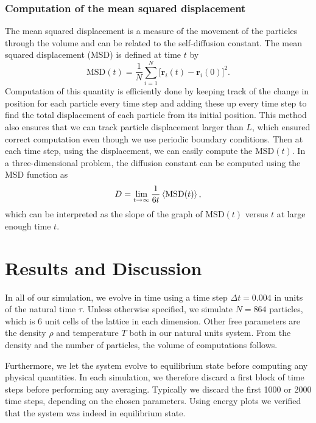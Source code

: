 \documentclass[twoside]{article}
\begin{document}
\subsubsection*{Computation of the mean squared displacement}
The mean squared displacement is a measure of the movement of the particles through the volume and can be related to the self-diffusion constant. The mean squared displacement (MSD) is defined at time $t$ by
\begin{equation}
\mathrm{MSD}(t) = \frac{1}{N} \sum_{i=1}^{N} \Big[\mathbf{r}_i(t) - \mathbf{r}_i(0)\Big]^2.
\end{equation}
Computation of this quantity is efficiently done by keeping track of the change in position for each particle every time step and adding these up every time step to find the total displacement of each particle from its initial position. This method also ensures that we can track particle displacement larger than $L$, which ensured correct computation even though we use periodic boundary conditions. Then at each time step, using the displacement, we can easily compute the $\mathrm{MSD}(t)$.
In a three-dimensional problem, the diffusion constant can be computed using the MSD function as\cite{ref_Al-Matar}
\begin{equation}
D = \lim\limits_{t\rightarrow\infty} \frac{1}{6t} \braket{\mathrm{MSD}(t)},
\end{equation}
which can be interpreted as the slope of the graph of $\mathrm{MSD}(t)$ versus $t$ at large enough time $t$.


\section{Results and Discussion}
In all of our simulation, we evolve in time using a time step $\Delta t = 0.004$ in units of the natural time $\tau$. Unless otherwise specified, we simulate $N = 864$ particles, which is 6 unit cells of the lattice in each dimension. Other free parameters are the density $\rho$ and temperature $T$ both in our natural units system. From the density and the number of particles, the volume of computations follows.

Furthermore, we let the system evolve to equilibrium state before computing any physical quantities. In each simulation, we therefore discard a first block of time steps before performing any averaging. Typically we discard the first 1000 or 2000 time steps, depending on the chosen parameters. Using energy plots we verified that the system was indeed in equilibrium state.
\end{document}
